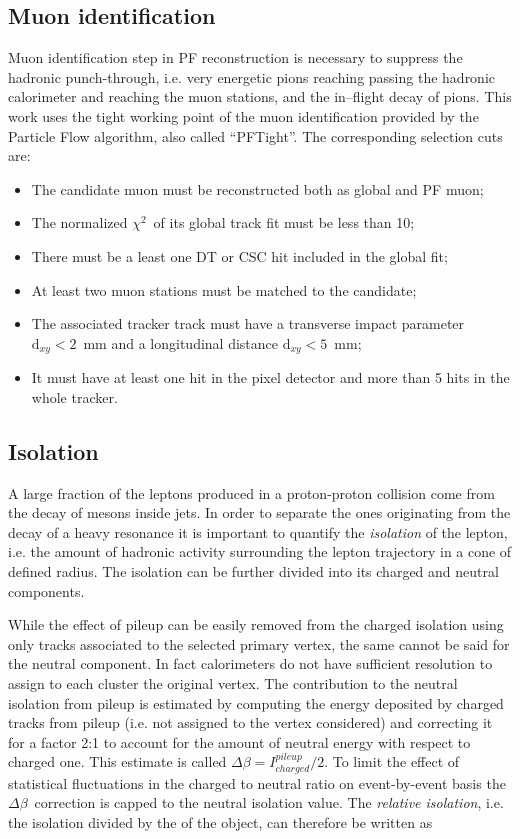 \subsection{Muon identification}

Muon identification step in PF reconstruction is necessary to suppress the hadronic punch-through, i.e. very energetic pions reaching passing the hadronic calorimeter and reaching the muon stations, and the in--flight decay of pions. This work uses the tight working point of the muon identification provided by the Particle Flow algorithm, also called ``PFTight''.
The corresponding selection cuts are:

\begin{itemize}
\item The candidate muon must be reconstructed both as global and PF muon;
\item The normalized $\chi^2$\ of its global track fit must be less than 10;
\item There must be a least one DT or CSC hit included in the global fit;
\item At least two muon stations must be matched to the candidate;
\item The associated tracker track must have a transverse impact parameter $\mathrm{d}_{xy} < 2$\ mm and a longitudinal distance $\mathrm{d}_{xy} < 5$\ mm;
\item It must have at least one hit in the pixel detector and more than 5 hits in the whole tracker.
\end{itemize}

\subsection{Isolation}

A large fraction of the leptons produced in a proton-proton collision come from the decay of mesons inside jets. In order to separate the ones originating from the decay of a heavy resonance it is important to quantify the \emph{isolation} of the lepton, i.e. the amount of hadronic activity surrounding the lepton trajectory in a cone of defined radius. The isolation can be further divided into its charged and neutral components. 

While the effect of pileup can be easily removed from the charged isolation using only tracks associated to the selected primary vertex, the same cannot be said for the neutral component. In fact calorimeters do not have sufficient resolution to assign to each cluster the original vertex. The contribution to the neutral isolation from pileup is estimated by computing the energy deposited by charged tracks from pileup (i.e. not assigned to the vertex considered) and correcting it for a factor 2:1 to account for the amount of neutral energy with respect to charged one. This estimate is called \emph{$\Delta\beta = I^{pileup}_{charged}/2$}. To limit the effect of statistical fluctuations in the charged to neutral ratio on event-by-event basis the $\Delta\beta$\ correction is capped to the neutral isolation value. The \emph{relative isolation}, i.e. the isolation divided by the \pT of the object, can therefore be written as

